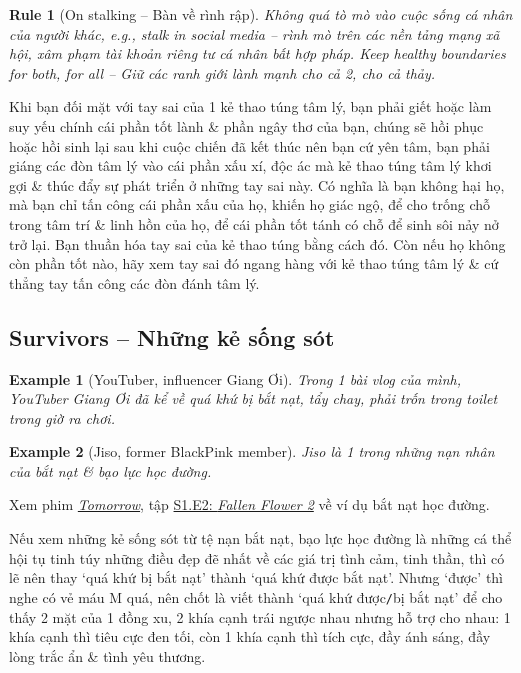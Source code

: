 \documentclass[12pt,twoside]{book}
\newtheorem{example}{Example}
\newtheorem{Rule}{Rule}
\begin{document}
\begin{Rule}[On stalking -- Bàn về rình rập]
	Không quá tò mò vào cuộc sống cá nhân của người khác, e.g., stalk in social media -- rình mò trên các nền tảng mạng xã hội, xâm phạm tài khoản  riêng tư cá nhân bất hợp pháp. Keep healthy boundaries for both, for all -- Giữ các ranh giới lành mạnh cho cả 2, cho cả thảy.
\end{Rule}
Khi bạn đối mặt với tay sai của 1 kẻ thao túng tâm lý, bạn phải giết hoặc làm suy yếu chính cái phần tốt lành \& phần ngây thơ của bạn, chúng sẽ hồi phục hoặc hồi sinh lại sau khi cuộc chiến đã kết thúc nên bạn cứ yên tâm, bạn phải giáng các đòn tâm lý vào cái phần xấu xí, độc ác mà kẻ thao túng tâm lý khơi gợi \& thúc đẩy sự phát triển ở những tay sai này. Có nghĩa là bạn không hại họ, mà bạn chỉ tấn công cái phần xấu của họ, khiến họ giác ngộ, để cho trống chỗ trong tâm trí \& linh hồn của họ, để cái phần tốt tánh có chỗ để sinh sôi nảy nở trở lại. Bạn thuần hóa tay sai của kẻ thao túng bằng cách đó. Còn nếu họ không còn phần tốt nào, hãy xem tay sai đó ngang hàng với kẻ thao túng tâm lý \& cứ thẳng tay tấn công các đòn đánh tâm lý.

\subsection{Survivors -- Những kẻ sống sót}

\begin{example}[YouTuber, influencer {\sc Giang Ơi}]
	Trong 1 bài vlog của mình, YouTuber {\sc Giang Ơi} đã kể về quá khứ bị bắt nạt, tẩy chay, phải trốn trong toilet trong giờ ra chơi.
\end{example}

\begin{example}[{\sc Jiso}, former BlackPink member]
	{\sc Jiso} là 1 trong những nạn nhân của bắt nạt \& bạo lực học đường.
\end{example}
Xem phim \href{https://www.imdb.com/title/tt18926162/}{\it Tomorrow}, tập \href{https://www.imdb.com/title/tt19355032/}{S1.E2: {\it Fallen Flower 2}} về ví dụ bắt nạt học đường.

Nếu xem những kẻ sống sót từ tệ nạn bắt nạt, bạo lực học đường là những cá thể hội tụ tinh túy những điều đẹp đẽ nhất về các giá trị tình cảm, tinh thần, thì có lẽ nên thay `quá khứ bị bắt nạt' thành `quá khứ được bắt nạt'. Nhưng `được' thì nghe có vẻ máu M quá, nên chốt là viết thành `quá khứ được{\tt/}bị bắt nạt' để cho thấy 2 mặt của 1 đồng xu, 2 khía cạnh trái ngược nhau nhưng hỗ trợ cho nhau: 1 khía cạnh thì tiêu cực đen tối, còn 1 khía cạnh thì tích cực, đầy ánh sáng, đầy lòng trắc ẩn \& tình yêu thương.
\end{document}
